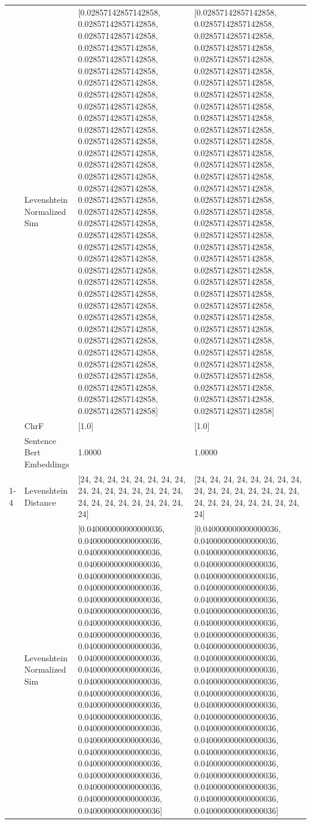 \begin{tabular}{llll}
 & Levenshtein Normalized Sim & [0.02857142857142858, 0.02857142857142858, 0.02857142857142858, 0.02857142857142858, 0.02857142857142858, 0.02857142857142858, 0.02857142857142858, 0.02857142857142858, 0.02857142857142858, 0.02857142857142858, 0.02857142857142858, 0.02857142857142858, 0.02857142857142858, 0.02857142857142858, 0.02857142857142858, 0.02857142857142858, 0.02857142857142858, 0.02857142857142858, 0.02857142857142858, 0.02857142857142858, 0.02857142857142858, 0.02857142857142858, 0.02857142857142858, 0.02857142857142858, 0.02857142857142858, 0.02857142857142858, 0.02857142857142858, 0.02857142857142858, 0.02857142857142858, 0.02857142857142858, 0.02857142857142858, 0.02857142857142858, 0.02857142857142858, 0.02857142857142858, 0.02857142857142858] & [0.02857142857142858, 0.02857142857142858, 0.02857142857142858, 0.02857142857142858, 0.02857142857142858, 0.02857142857142858, 0.02857142857142858, 0.02857142857142858, 0.02857142857142858, 0.02857142857142858, 0.02857142857142858, 0.02857142857142858, 0.02857142857142858, 0.02857142857142858, 0.02857142857142858, 0.02857142857142858, 0.02857142857142858, 0.02857142857142858, 0.02857142857142858, 0.02857142857142858, 0.02857142857142858, 0.02857142857142858, 0.02857142857142858, 0.02857142857142858, 0.02857142857142858, 0.02857142857142858, 0.02857142857142858, 0.02857142857142858, 0.02857142857142858, 0.02857142857142858, 0.02857142857142858, 0.02857142857142858, 0.02857142857142858, 0.02857142857142858, 0.02857142857142858] \\
 & ChrF & [1.0] & [1.0] \\
 & Sentence Bert Embeddings & 1.0000 & 1.0000 \\
\cline{1-4}
\multirow[t]{4}{*}{Amanyira nigo are omoyo k’era ogose.} & Levenshtein Distance & [24, 24, 24, 24, 24, 24, 24, 24, 24, 24, 24, 24, 24, 24, 24, 24, 24, 24, 24, 24, 24, 24, 24, 24, 24] & [24, 24, 24, 24, 24, 24, 24, 24, 24, 24, 24, 24, 24, 24, 24, 24, 24, 24, 24, 24, 24, 24, 24, 24, 24] \\
 & Levenshtein Normalized Sim & [0.040000000000000036, 0.040000000000000036, 0.040000000000000036, 0.040000000000000036, 0.040000000000000036, 0.040000000000000036, 0.040000000000000036, 0.040000000000000036, 0.040000000000000036, 0.040000000000000036, 0.040000000000000036, 0.040000000000000036, 0.040000000000000036, 0.040000000000000036, 0.040000000000000036, 0.040000000000000036, 0.040000000000000036, 0.040000000000000036, 0.040000000000000036, 0.040000000000000036, 0.040000000000000036, 0.040000000000000036, 0.040000000000000036, 0.040000000000000036, 0.040000000000000036] & [0.040000000000000036, 0.040000000000000036, 0.040000000000000036, 0.040000000000000036, 0.040000000000000036, 0.040000000000000036, 0.040000000000000036, 0.040000000000000036, 0.040000000000000036, 0.040000000000000036, 0.040000000000000036, 0.040000000000000036, 0.040000000000000036, 0.040000000000000036, 0.040000000000000036, 0.040000000000000036, 0.040000000000000036, 0.040000000000000036, 0.040000000000000036, 0.040000000000000036, 0.040000000000000036, 0.040000000000000036, 0.040000000000000036, 0.040000000000000036, 0.040000000000000036] \\

\end{tabular}
